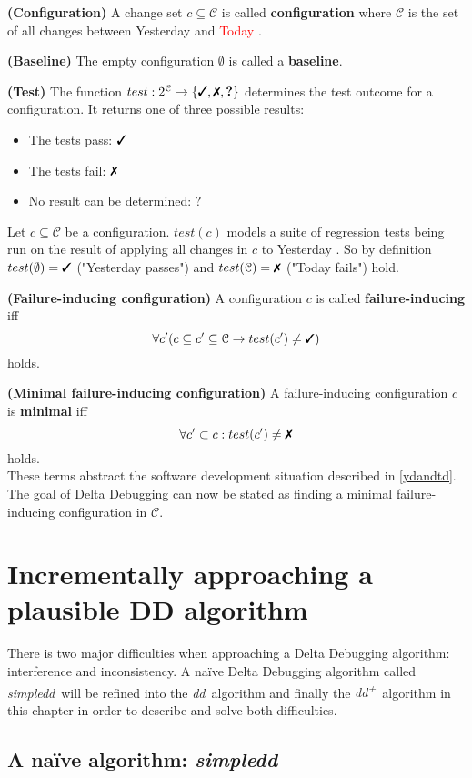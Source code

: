 \documentclass[a4paper,UKenglish]{lipics-v2018}
\newcommand{\sdd}[0]{\textit{simpledd}}
\newcommand{\dd}[0]{\textit{dd}}
\newcommand{\ddp}{\textit{dd\textsuperscript{+}}}
\newcommand{\green}[1]{\textcolor{td-green}{#1}}
\newcommand{\red}[1]{\textcolor{red}{#1}}
\newcommand{\yd}[0]{\green{Yesterday} }
\newcommand{\td}[0]{\red{Today} }
\newcommand{\C}[0]{\ensuremath{\mathcal{C}}}
\newcommand{\cmark}{\text{\ding{51}}}
\newcommand{\xmark}{\text{\ding{55}}}
\newcommand{\qmark}{\textbf{?}}
\newcommand{\defsub}[1]{\textbf{(#1)} }
\newcommand{\set}[1]{\left \{ #1 \right \}}
\begin{document}
 \defsub{Configuration} A change set $c \subseteq \C$ is called \textbf{configuration} where $\C$ is the set of all changes between \yd and \td.

 \defsub{Baseline} The empty configuration $\emptyset$ is called a \textbf{baseline}.

 \defsub{Test} The function $test: 2^{\C} \to \set{\cmark, \xmark, \qmark}$ determines the test outcome for a configuration. It returns one of three possible results: 
\begin{itemize}
	\item The tests pass: $\cmark$
	\item The tests fail: $\xmark$
	\item No result can be determined: $\qmark$
\end{itemize} 

Let $c \subseteq \C$ be a configuration. $test(c)$ models a suite of regression tests being run on the result of applying all changes in $c$ to \yd. So by definition $test(\emptyset) = \cmark$ ("Yesterday passes") and $test(\C) = \xmark$ ("Today fails") hold.

 \defsub{Failure-inducing configuration} A configuration $c$ is called \textbf{failure-inducing} iff 
\[ \forall c' (c \subseteq c' \subseteq \C \rightarrow test(c') \ne \cmark) \] 
holds.

 \defsub{Minimal failure-inducing configuration} A failure-inducing configuration $c$ is \textbf{minimal} iff 
\[ \forall c' \subset c: test(c') \ne \xmark \]
holds.\\


These terms abstract the software development situation described in \ref{ydandtd}. The goal of Delta Debugging can now be stated as finding a minimal failure-inducing configuration in $\C$.

\section{Incrementally approaching a plausible DD algorithm}

There is two major difficulties when approaching a Delta Debugging algorithm: interference and inconsistency. A na\"ive Delta Debugging algorithm called \sdd\ will be refined into the \dd\ algorithm and finally the \ddp\ algorithm in this chapter in order to describe and solve both difficulties. 

\subsection{A na\"ive algorithm: \sdd}
\end{document}
